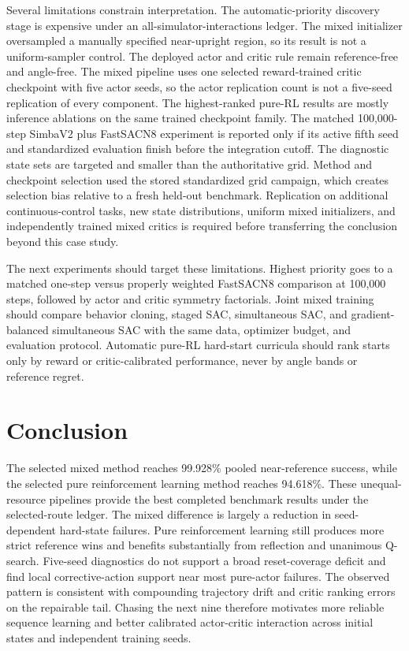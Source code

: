 \documentclass[10pt,twocolumn]{article}
\begin{document}
Several limitations constrain interpretation. The automatic-priority discovery stage is expensive under an all-simulator-interactions ledger. The mixed initializer oversampled a manually specified near-upright region, so its result is not a uniform-sampler control. The deployed actor and critic rule remain reference-free and angle-free. The mixed pipeline uses one selected reward-trained critic checkpoint with five actor seeds, so the actor replication count is not a five-seed replication of every component. The highest-ranked pure-RL results are mostly inference ablations on the same trained checkpoint family. The matched 100,000-step SimbaV2 plus FastSACN8 experiment is reported only if its active fifth seed and standardized evaluation finish before the integration cutoff. The diagnostic state sets are targeted and smaller than the authoritative grid. Method and checkpoint selection used the stored standardized grid campaign, which creates selection bias relative to a fresh held-out benchmark. Replication on additional continuous-control tasks, new state distributions, uniform mixed initializers, and independently trained mixed critics is required before transferring the conclusion beyond this case study.

The next experiments should target these limitations. Highest priority goes to a matched one-step versus properly weighted FastSACN8 comparison at 100,000 steps, followed by actor and critic symmetry factorials. Joint mixed training should compare behavior cloning, staged SAC, simultaneous SAC, and gradient-balanced simultaneous SAC with the same data, optimizer budget, and evaluation protocol. Automatic pure-RL hard-start curricula should rank starts only by reward or critic-calibrated performance, never by angle bands or reference regret.

\section{Conclusion}

The selected mixed method reaches 99.928\% pooled near-reference success, while the selected pure reinforcement learning method reaches 94.618\%. These unequal-resource pipelines provide the best completed benchmark results under the selected-route ledger. The mixed difference is largely a reduction in seed-dependent hard-state failures. Pure reinforcement learning still produces more strict reference wins and benefits substantially from reflection and unanimous Q-search. Five-seed diagnostics do not support a broad reset-coverage deficit and find local corrective-action support near most pure-actor failures. The observed pattern is consistent with compounding trajectory drift and critic ranking errors on the repairable tail. Chasing the next nine therefore motivates more reliable sequence learning and better calibrated actor-critic interaction across initial states and independent training seeds.
\end{document}
